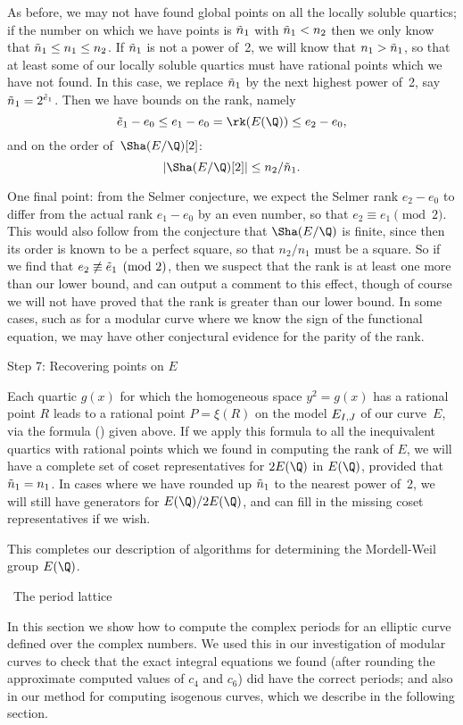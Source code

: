 As before, we may not have found global points on all the locally
soluble quartics; if the number on which we have points is $\tn1$
with $\tn1<n_2$ then we only know that $\tn1 \le n_1 \le n_2$.  If
$\tn1$ is not a power of~2, we will know that $n_1>\tn1$, so that at
least some of our locally soluble quartics must have rational points
which we have not found.  In this case, we replace $\tn1$ by the next
highest power of~2, say $\tn1=2^{\te1}$.  Then we have bounds on
the rank, namely
$$
    \te1-e_0 \le e_1-e_0 = \rk(E(\Q)) \le e_2-e_0,
$$
and on the order of~$\Sha(E/\Q)[2]$:
$$
    \left|\Sha(E/\Q)[2]\right| \le n_2/\tn1.
$$

One final point: from the Selmer conjecture, we expect the Selmer rank
$e_2-e_0$ to differ from the actual rank $e_1-e_0$ by an even number,
so that $e_2\equiv e_1\pmod2$.  This would also follow from
the conjecture that $\Sha(E/\Q)$ is finite, since then its order is
known to be a perfect square, so that $n_2/n_1$ must be a square.  So
if we find that $e_2\not\equiv\te1\pmod2$, then we suspect that the
rank is at least one more than our lower bound, and can output a
comment to this effect, though of course we will not have proved that the
rank is greater than our lower bound.  In some cases, such as for a
modular curve where we know the sign of the functional equation, we
may have other conjectural evidence for the parity of the rank.

\subhead Step 7: Recovering points on $E$ \endsubhead

Each quartic $g(x)$ for which the homogeneous space $y^2=g(x)$ has a
rational point $R$ leads to a rational point $P=\xi(R)$ on the model
$E_{I,J}$ of our curve~$E$, via the formula (\ximap) given above.  If we
apply this formula to all the inequivalent quartics with rational
points which we found in computing the rank of $E$, we will have a
complete set of coset representatives for $2E(\Q)$ in $E(\Q)$,
provided that $\tn1=n_1$.  In cases where we have rounded up $\tn1$ to
the nearest power of~2, we will still have generators for
$E(\Q)/2E(\Q)$, and can fill in the missing coset representatives if
we wish.

\bigskip

This completes our description of algorithms for determining the
Mordell-Weil group $E(\Q)$.

%
%
\beginsection{\Periods}
\head\Periods\ The period lattice \endhead

In this section we show how to compute the complex periods for an 
elliptic curve defined over the complex numbers.  We used this in our 
investigation of modular curves to check that the exact integral 
equations we found (after rounding the approximate computed values of 
$c_4$ and $c_6$) did have the correct periods; and also in our method for 
computing isogenous curves, which we describe in the following section.

